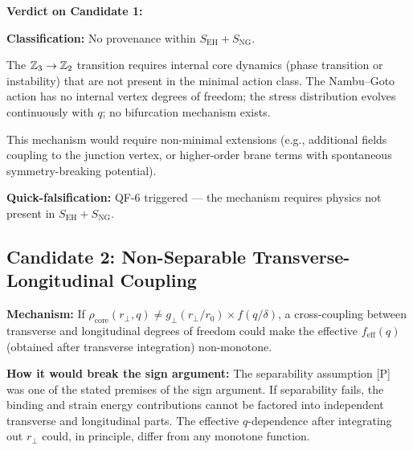 \textbf{Verdict on Candidate 1:}
\begin{resultbox}[title=Candidate 1: $\Zthree \to \Ztwo$ Transition]
\textbf{Classification:} No provenance within
$S_{\mathrm{EH}} + S_{\mathrm{NG}}$.

The $\Zthree \to \Ztwo$ transition requires internal core dynamics
(phase transition or instability) that are not present in the minimal
action class. The Nambu--Goto action has no internal vertex degrees of
freedom; the stress distribution evolves continuously with $q$; no
bifurcation mechanism exists.

This mechanism would require non-minimal extensions (e.g., additional
fields coupling to the junction vertex, or higher-order brane terms
with spontaneous symmetry-breaking potential).

\textbf{Quick-falsification:} QF-6 triggered --- the mechanism requires
physics not present in $S_{\mathrm{EH}} + S_{\mathrm{NG}}$.
\tagDc
\end{resultbox}

\subsection{Candidate 2: Non-Separable Transverse-Longitudinal Coupling}

\textbf{Mechanism:} If $\rho_{\mathrm{core}}(r_\perp, q) \neq
g_\perp(r_\perp/r_0) \times f(q/\delta)$, a cross-coupling between
transverse and longitudinal degrees of freedom could make the
effective $f_{\mathrm{eff}}(q)$ (obtained after transverse integration)
non-monotone.

\textbf{How it would break the sign argument:}
The separability assumption [P] was one of the stated premises of the
sign argument. If separability fails, the binding and strain energy
contributions cannot be factored into independent transverse and
longitudinal parts. The effective $q$-dependence after integrating
out $r_\perp$ could, in principle, differ from any monotone function.

